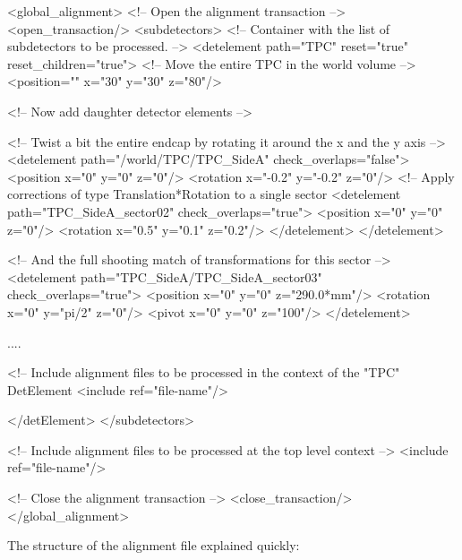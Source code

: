 \documentclass[10pt,a4paper]{article}
\begin{document}
\begin{code}
<global_alignment>
  <!-- Open the alignment transaction  -->
  <open_transaction/>
  <subdetectors>         <!-- Container with the list of subdetectors to be processed. -->
    <detelement path="TPC" reset="true" reset_children="true">
      <!-- Move the entire TPC in the world volume                                     -->
      <position="" x="30"   y="30"  z="80"/>

      <!-- Now add daughter detector elements                                          -->

      <!-- Twist a bit the entire endcap by rotating it around the x and the y axis    -->
      <detelement path="/world/TPC/TPC_SideA" check_overlaps="false">
        <position x="0"   y="0"  z="0"/>
        <rotation x="-0.2" y="-0.2"  z="0"/>
        <!-- Apply corrections of type Translation*Rotation to a single sector           
        <detelement path="TPC_SideA_sector02" check_overlaps="true">
          <position x="0"   y="0"   z="0"/>
          <rotation x="0.5" y="0.1" z="0.2"/>     
        </detelement>
      </detelement>

      <!-- And the full shooting match of transformations for this sector              -->
      <detelement path="TPC_SideA/TPC_SideA_sector03" check_overlaps="true">
        <position x="0" y="0"    z="290.0*mm"/>
        <rotation x="0" y="pi/2" z="0"/>     
        <pivot    x="0" y="0"    z="100"/>     
      </detelement>

      ....

      <!-- Include alignment files to be processed in the context of the "TPC" DetElement
      <include ref="file-name"/>

    </detElement>            
  </subdetectors>

  <!-- Include alignment files to be processed at the top level context               -->
  <include ref="file-name"/>

  <!-- Close the alignment transaction  -->
  <close_transaction/>
</global_alignment>
\end{code}

\noindent
The structure of the alignment file explained quickly:
\end{document}
